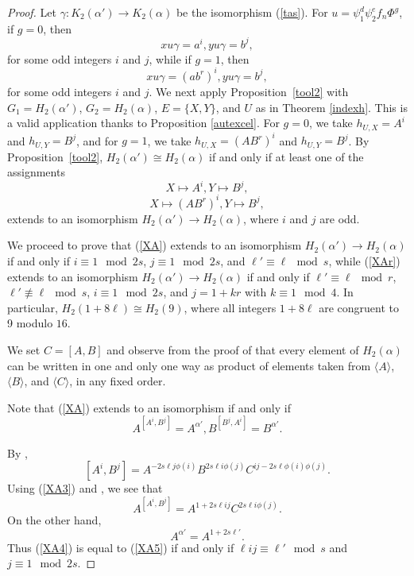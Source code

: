 \documentclass{amsart}
\theoremstyle{definition}
\theoremstyle{remark}
\begin{document}
\begin{proof} Let $\gamma:K_2(\alpha')\to K_2(\alpha)$ be the isomorphism (\ref{tas}). For $u=\psi_1^d\psi_2^e f_n \Phi^g$,
if $g=0$, then
$$
xu\gamma=a^i, yu\gamma=b^j,
$$
for some odd integers $i$ and $j$, while if $g=1$, then
$$
xu\gamma=(ab^r)^i, yu\gamma=b^j,
$$
for some odd integers $i$ and $j$. We next apply Proposition~\ref{tool2} with $G_1=H_2(\alpha')$, $G_2=H_2(\alpha)$, $E=\{X,Y\}$, and $U$ as in Theorem \ref{indexh}.
This is a valid application thanks to Proposition \ref{autexcel}. For $g=0$, we take $h_{U,X}=A^i$ and $h_{U,Y}=B^j$,
and for $g=1$, we take $h_{U,X}=(AB^r)^i$ and $h_{U,Y}=B^j$. By Proposition~\ref{tool2}, $H_2(\alpha')\cong H_2(\alpha)$ if and only if
at least one of the assignments
\begin{equation}
\label{XA}
X\mapsto A^i, Y\mapsto B^j,
\end{equation}
\begin{equation}
\label{XAr}
X\mapsto (AB^r)^i, Y\mapsto B^j,
\end{equation}
extends to an isomorphism $H_2(\alpha')\to H_2(\alpha)$, where $i$ and $j$ are odd.

We proceed to prove that (\ref{XA}) extends to an isomorphism $H_2(\alpha')\to H_2(\alpha)$ if and only if
$i\equiv 1\mod 2s$, $j\equiv 1\mod 2s$, and $\ell'\equiv \ell\mod s$, while (\ref{XAr})
extends to an isomorphism $H_2(\alpha')\to H_2(\alpha)$ if and only if
$\ell'\equiv \ell\mod r$, $\ell'\not\equiv \ell\mod s$, $i\equiv 1\mod 2s$, and $j=1+kr$ with $k\equiv 1\mod 4$.
In particular, $H_2(1+8\ell)\cong H_2(9)$, where all integers $1+8\ell$ are congruent to 9 modulo $16$.

We set $C=[A,B]$ and observe from the proof of \cite[Theorem 8.1]{MS} that every element of $H_2(\alpha)$ can be written in one
and only one way as product of elements taken from $\langle A\rangle$, $\langle B\rangle$, and $\langle C\rangle$,
in any fixed order.

Note that (\ref{XA}) extends to an isomorphism if and only if
\begin{equation}
\label{XA2}
A^{[A^i,B^j]}=A^{\alpha'}, B^{[B^j,A^i]}=B^{\alpha'}.
\end{equation}

By \cite[Corollary 6.1]{MS3},
\begin{equation}
\label{XA3}
[A^i,B^j]=A^{-2s\ell j\phi(i)}B^{2s\ell i\phi(j)}C^{ij-2s\ell \phi(i)\phi(j)}.
\end{equation}
Using (\ref{XA3}) and \cite[Corollary 6.1]{MS3}, we see that
\begin{equation}
\label{XA4}
A^{[A^i,B^j]}=A^{1+2s\ell ij}C^{2s\ell i\phi(j)}.
\end{equation}
On the other hand,
\begin{equation}
\label{XA5}
A^{\alpha'}=A^{1+2s\ell'}.
\end{equation}
Thus (\ref{XA4}) is equal to (\ref{XA5}) if and only if $\ell ij\equiv \ell'\mod s$ and $j\equiv 1\mod 2s$.


\end{proof}
\end{document}
